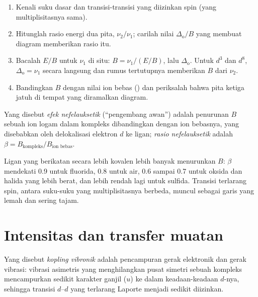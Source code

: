 \begin{method}\label{met:b3:complex-spectra-magnetism:read-ts}
\begin{enumerate}
  \item Kenali suku dasar dan transisi-transisi yang diizinkan spin (yang
        multiplisitasnya sama).
  \item Hitunglah rasio energi dua pita, $\nu_2/\nu_1$; carilah nilai $\Delta_{\mathrm o}/B$ yang
        membuat diagram memberikan rasio itu.
  \item Bacalah $E/B$ untuk $\nu_1$ di situ: $B = \nu_1/(E/B)$, lalu $\Delta_{\mathrm o}$. Untuk $d^3$ dan $d^8$, $\Delta_{\mathrm o} = \nu_1$
        secara langsung dan rumus tertutupnya memberikan $B$ dari $\nu_2$.
  \item Bandingkan $B$ dengan nilai ion bebas () dan periksalah bahwa
        pita ketiga jatuh di tempat yang diramalkan diagram.
\end{enumerate}
\end{method}

\begin{definition}\label{def:b3:complex-spectra-magnetism:nephelauxetic}
Yang disebut \emph{efek nefelauksetik} (``pengembang awan'') adalah
penurunan  $B$ sebuah ion logam dalam kompleks dibandingkan dengan
ion bebasnya, yang disebabkan oleh delokalisasi elektron $d$ ke
ligan; \emph{rasio nefelauksetik} adalah $\beta =
B_{\text{kompleks}}/B_{\text{ion bebas}}$.
\end{definition}

Ligan yang berikatan secara lebih kovalen lebih banyak menurunkan $B$: $\beta$ mendekati 0.9 untuk fluorida, 0.8
untuk air, 0.6 sampai 0.7 untuk oksida dan halida yang lebih berat, dan lebih
rendah lagi untuk sulfida. Transisi terlarang spin, antara suku-suku yang
multiplisitasnya berbeda, muncul sebagai garis yang lemah dan sering tajam.

\section{Intensitas dan transfer muatan}

\begin{definition}\label{def:b3:complex-spectra-magnetism:vibronic-coupling}
Yang disebut \emph{kopling vibronik} adalah pencampuran gerak elektronik
dan gerak vibrasi: vibrasi asimetris yang menghilangkan pusat simetri sebuah
kompleks mencampurkan sedikit karakter ganjil ($u$) ke dalam keadaan-keadaan $d$-nya,
sehingga transisi $d$--$d$ yang terlarang Laporte menjadi sedikit diizinkan.
\end{definition}

